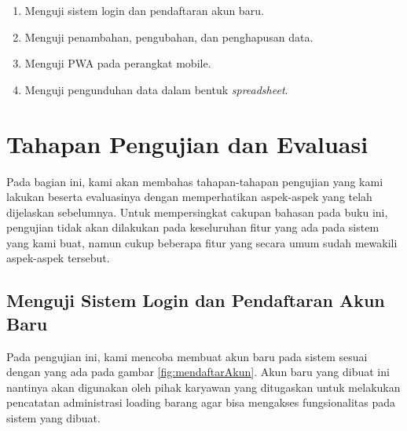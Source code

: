 \begin{enumerate}[nolistsep]

  \item Menguji sistem login dan pendaftaran akun baru.
  \vspace{0.5ex}

  \item Menguji penambahan, pengubahan, dan penghapusan data.
  \vspace{0.5ex}

  \item Menguji PWA pada perangkat mobile.
  \vspace{0.5ex}

  \item Menguji pengunduhan data dalam bentuk \emph{spreadsheet}.
  \vspace{0.5ex}

\end{enumerate}
\vspace{0.5ex}

\newpage

\section{Tahapan Pengujian dan Evaluasi}
\vspace{1ex}

Pada bagian ini, kami akan membahas tahapan-tahapan pengujian yang kami lakukan beserta evaluasinya dengan memperhatikan aspek-aspek yang telah dijelaskan sebelumnya.
Untuk mempersingkat cakupan bahasan pada buku ini, pengujian tidak akan dilakukan pada keseluruhan fitur yang ada pada sistem yang kami buat, namun cukup beberapa fitur yang secara umum sudah mewakili aspek-aspek tersebut.
\vspace{0.5ex}

\subsection{Menguji Sistem Login dan Pendaftaran Akun Baru}
\vspace{1ex}

Pada pengujian ini, kami mencoba membuat akun baru pada sistem sesuai dengan yang ada pada gambar \ref{fig:mendaftarAkun}.
Akun baru yang dibuat ini nantinya akan digunakan oleh pihak karyawan yang ditugaskan untuk melakukan pencatatan administrasi loading barang agar bisa mengakses fungsionalitas pada sistem yang dibuat.
\vspace{0.5ex}


